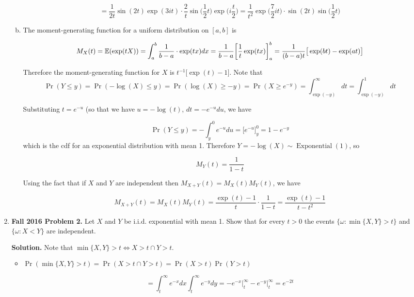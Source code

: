 \begin{enumerate}[(1)]
\begin{enumerate}[(a)]
\[
= \frac{1}{2t} \sin ( 2t ) \exp (3it) \cdot \frac{2}{t} \sin \bigg( \frac{1}{2} t \bigg) \exp \bigg(i \frac{t}{2} \bigg) = \boxed{ \frac{1}{t^2} \exp \bigg( \frac{7}{2}it \bigg)\cdot \sin ( 2t ) \sin \bigg( \frac{1}{2} t \bigg)}
\]

\item The moment-generating function for a uniform distribution on \([a, b]\) is 

\[
M_X(t) = \mathbb{E}(\exp(tX)) = \int_a^b \frac{1}{b-a} \cdot \exp(tx) dx = \frac{1}{b-a} \bigg[ \frac{1}{t} \exp(tx) \bigg]_a^b =  \frac{1}{(b-a)t} \big[ \exp(bt) - \exp(at) \big]
\]

Therefore the moment-generating function for \(X\) is \(t^{-1} \big[ \exp(t) - 1\big]\). Note that
\[
\Pr(Y \leq y) = \Pr(- \log(X) \leq y) = \Pr( \log(X) \geq -y)  = \Pr(X \geq e^{-y}) = \int_{\exp(-y)}^\infty dt = \int_{\exp(-y)}^1 dt
\]

Substituting \(t = e^{-u}\) (so that we have \(u = -\log(t)\), \(dt = -e^{-u} du\), we have

\[
\Pr(Y \leq y) =  -\int_{y}^{0}  e^{-u} du = \big[e^{-u} \big]_y^0 = 1 - e^{- y}
\]
which is the cdf for an exponential distribution with mean 1. Therefore \(Y = - \log(X) \sim \operatorname{Exponential}(1)\), so

\[
M_Y(t) = \frac{1}{1- t}
\]

Using the fact that if \(X\) and \(Y\) are independent then \(M_{X +Y}(t) = M_X(t) M_Y(t)\), we have

\[
M_{X +Y}(t) = M_X(t) M_Y(t) = \frac{\exp(t) - 1}{t} \cdot \frac{1}{1- t} = \boxed{\frac{\exp(t) - 1}{t - t^2}  }
\]

\end{enumerate}


\item \textbf{Fall 2016 Problem 2.} Let \(X\) and \(Y\) be i.i.d. exponential with mean 1. Show that for every \(t > 0\) the events \(\{\omega: \min\{X,Y\} > t\}\) and \(\{\omega: X < Y \}\) are independent.

\textbf{Solution.} Note that \(\min\{X,Y\} > t \iff X > t \cap Y > t\). 

\begin{itemize}

\item \(\Pr(\min\{X, Y\} > t) = \Pr(X > t \cap Y > t) = \Pr(X>t) \Pr(Y > t)\)

\[
= \int_t^\infty e^{-x}dx\int_t^\infty e^{-y}dy = -e^{-x} \big|_t^\infty -e^{-y} \big|_t^\infty = \boxed{e^{-2t}}
\]


\end{itemize}
\end{enumerate}
